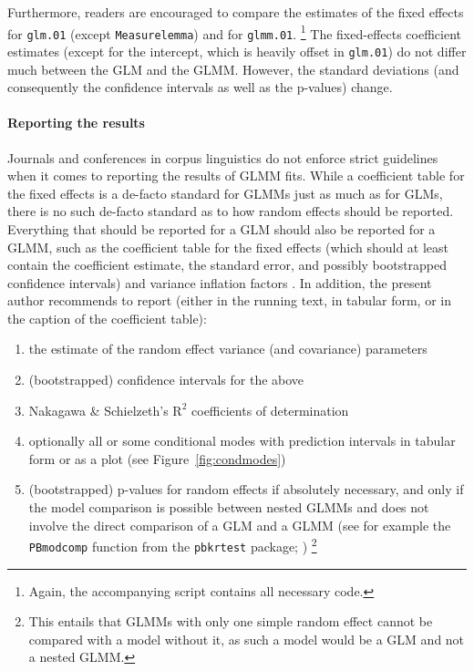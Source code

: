 Furthermore, readers are encouraged to compare the estimates of the fixed effects for \texttt{glm.01} (except \texttt{Measurelemma}) and for \texttt{glmm.01}.%
\footnote{Again, the accompanying script contains all necessary code.}
The fixed-effects coefficient estimates (except for the intercept, which is heavily offset in \texttt{glm.01}) do not differ much between the GLM and the GLMM.
However, the standard deviations (and consequently the confidence intervals as well as the p-values) change.

\paragraph{Reporting the results}

Journals and conferences in corpus linguistics do not enforce strict guidelines when it comes to reporting the results of GLMM fits.
While a coefficient table for the fixed effects is a de-facto standard for GLMMs just as much as for GLMs, there is no such de-facto standard as to how random effects should be reported.
Everything that should be reported for a GLM should also be reported for a GLMM, such as the coefficient table for the fixed effects (which should at least contain the coefficient estimate, the standard error, and possibly bootstrapped confidence intervals) and variance inflation factors \citep{FoxMonette1992,ZuurEa2010}.
In addition, the present author recommends to report (either in the running text, in tabular form, or in the caption of the coefficient table):

\begin{enumerate}
  \item the estimate of the random effect variance (and covariance) parameters
  \item (bootstrapped) confidence intervals for the above
  \item Nakagawa \& Schielzeth's $\textrm{R}^{\textrm{2}}$ coefficients of determination
  \item optionally all or some conditional modes with prediction intervals in tabular form or as a plot (see Figure~\ref{fig:condmodes})
  \item (bootstrapped) p-values for random effects if absolutely necessary, and only if the model comparison is possible between nested GLMMs and does not involve the direct comparison of a GLM and a GLMM (see for example the \texttt{PBmodcomp} function from the \texttt{pbkrtest} package; \citealt{HalekohHojsgaard2014})%
    \footnote{This entails that GLMMs with only one simple random effect cannot be compared with a model without it, as such a model would be a GLM and not a nested GLMM.}
\end{enumerate}

